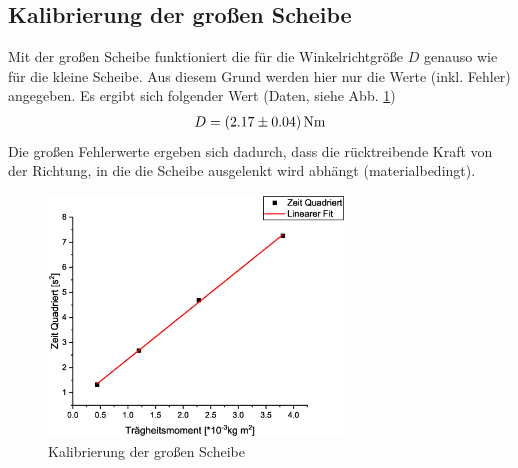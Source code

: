 \subsection{Kalibrierung der großen Scheibe}
Mit der großen Scheibe funktioniert die für die Winkelrichtgröße $D$ genauso wie für die kleine Scheibe. Aus diesem Grund werden hier nur die Werte (inkl. Fehler) angegeben. Es ergibt sich folgender Wert (Daten, siehe Abb. \ref{fig:kal2})
\begin{align*}
D = \unit[(2.17 \pm 0.04)]{N m}
\end{align*}
Die großen Fehlerwerte ergeben sich dadurch, dass die rücktreibende Kraft von der Richtung, in die die Scheibe ausgelenkt wird abhängt (materialbedingt).

\begin{figure}
\begin{center}
\includegraphics[width=0.7\textwidth]{Bilder/kal2.eps}
\caption{Kalibrierung der großen Scheibe}
\label{fig:kal2}
\end{center}
\end{figure}